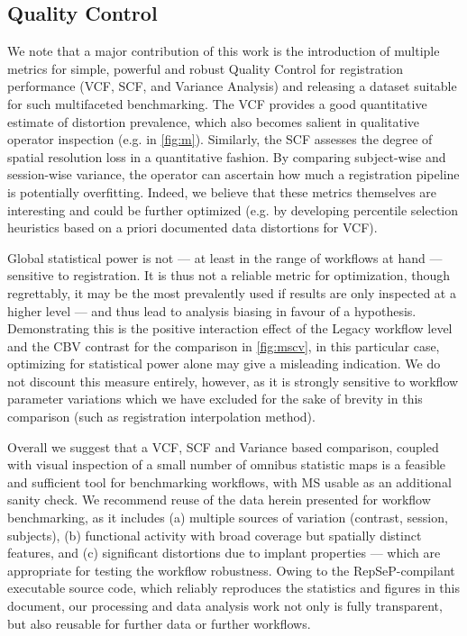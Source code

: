 \subsection{Quality Control}

We note that a major contribution of this work is the introduction of multiple metrics for simple, powerful and robust Quality Control for registration performance (VCF, SCF, and Variance Analysis) and releasing a dataset suitable for such multifaceted benchmarking.
The VCF provides a good quantitative estimate of distortion prevalence, which also becomes salient in qualitative operator inspection (e.g. in \cref{fig:m}).
Similarly, the SCF assesses the degree of spatial resolution loss in a quantitative fashion.
By comparing subject-wise and session-wise variance, the operator can ascertain how much a registration pipeline is potentially overfitting.
Indeed, we believe that these metrics themselves are interesting and could be further optimized (e.g. by developing percentile selection heuristics based on a priori documented data distortions for VCF).

Global statistical power is not --- at least in the range of workflows at hand --- sensitive to registration.
It is thus not a reliable metric for optimization, though regrettably, it may be the most prevalently used if results are only inspected at a higher level --- and thus lead to analysis biasing in favour of a hypothesis.
Demonstrating this is the positive interaction effect of the Legacy workflow level and the CBV contrast for the comparison in \cref{fig:mscv}, in this particular case, optimizing for statistical power alone may give a misleading indication.
We do not discount this measure entirely, however, as it is strongly sensitive to workflow parameter variations which we have excluded for the sake of brevity in this comparison (such as registration interpolation method).

Overall we suggest that a VCF, SCF and Variance based comparison, coupled with visual inspection of a small number of omnibus statistic maps is a feasible and sufficient tool for benchmarking workflows, with MS usable as an additional sanity check.
We recommend reuse of the data herein presented for workflow benchmarking, as it includes (a) multiple sources of variation (contrast, session, subjects), (b) functional activity with broad coverage but spatially distinct features, and (c) significant distortions due to implant properties --- which are appropriate for testing the workflow robustness.
Owing to the RepSeP-compilant executable source code, which reliably reproduces the statistics and figures in this document, our processing and data analysis work not only is fully transparent, but also reusable for further data or further workflows.

